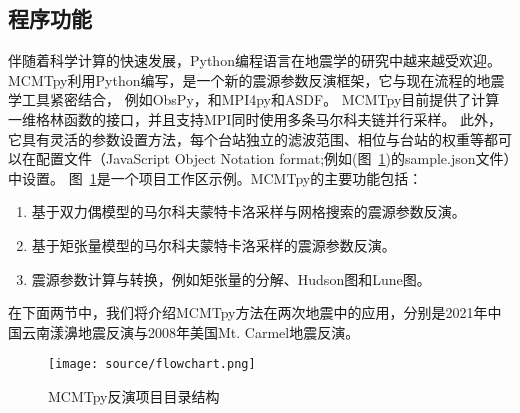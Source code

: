 \subsection{程序功能}

伴随着科学计算的快速发展，Python编程语言在地震学的研究中越来越受欢迎。
MCMTpy利用Python编写，是一个新的震源参数反演框架，它与现在流程的地震学工具紧密结合，
例如ObsPy\citep{Beyreuther2010}，和MPI4py\citep{Dalcin2011}和ASDF\citep{Krischer2016}。
MCMTpy目前提供了计算一维格林函数的接口，并且支持MPI同时使用多条马尔科夫链并行采样。
此外，它具有灵活的参数设置方法，每个台站独立的滤波范围、相位与台站的权重等都可以在配置文件（JavaScript Object Notation format;例如(图~\ref{fig:flowchart})的sample.json文件）中设置。
图~\ref{fig:flowchart}是一个项目工作区示例。MCMTpy的主要功能包括：
\begin{enumerate}
\item 基于双力偶模型的马尔科夫蒙特卡洛采样与网格搜索的震源参数反演。
\item 基于矩张量模型的马尔科夫蒙特卡洛采样的震源参数反演。
\item 震源参数计算与转换，例如矩张量的分解、Hudson图\citep{Hudson1989}和Lune图\citep{Tape2012}。
\end{enumerate}
在下面两节中，我们将介绍MCMTpy方法在两次地震中的应用，分别是2021年中国云南漾濞地震反演与2008年美国Mt. Carmel地震反演。

\begin{figure}[p]
    \centering
    \texttt{[image: source/flowchart.png]}
    \caption{MCMTpy反演项目目录结构}
    \label{fig:flowchart}
\end{figure}



